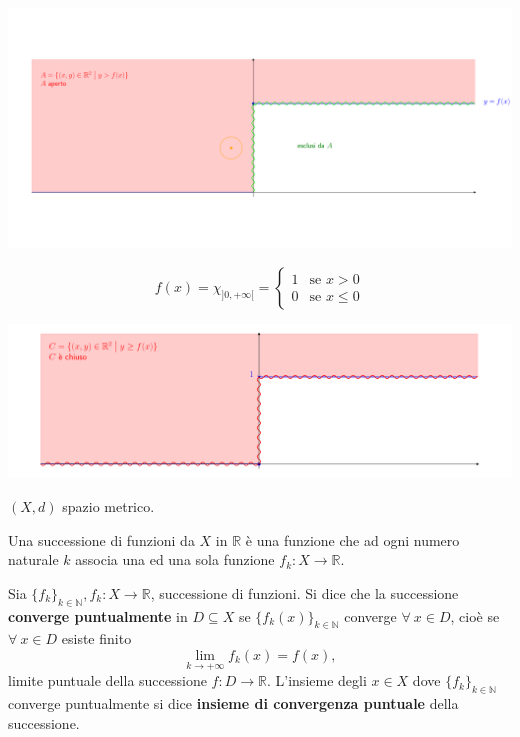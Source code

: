\begin{exbar}
\begin{example}
\begin{enumerate}
		\begin{center}
			\includegraphics[width=0.7\linewidth]{spazi_metrici_e_normati/pag181_1}
			\label{fig:pag1811}
		\end{center}
		
		\begin{equation*}
			f(x) = 		\chi_{]0,+\infty[} = 
			\begin{cases}
				1 & \text{se } x > 0
				\\
				0 &  \text{se } x \leq 0
			\end{cases}
		\end{equation*}
		
		\begin{center}
			\includegraphics[width=0.7\linewidth]{spazi_metrici_e_normati/pag181_2}
			\label{fig:pag1812}
		\end{center}
	\end{enumerate}
\end{example}
\end{exbar}




$(X,d)$ spazio metrico.
	
Una successione di funzioni da $X$ in $\mathbb{R}$ è una funzione che ad ogni numero naturale $k$ associa una ed una sola funzione $f_k : X \rightarrow \mathbb{R}$. 


\begin{definition}
	Sia $\{ f_k \}_{k \in \mathbb{N}}, f_k : X \rightarrow \mathbb{R}$, successione di funzioni. Si dice che la successione \textbf{converge puntualmente} in $D \subseteq X$ se $\{ f_k(x) \}_{k \in \mathbb{N}}$ converge $\forall \ x \in D$, cioè se $\forall \ x \in D$ esiste finito
	\begin{equation*}
		\lim_{k \rightarrow + \infty} f_k(x) = f(x),
	\end{equation*}
	limite puntuale della successione $f : D \rightarrow \mathbb{R}$. L'insieme degli $x \in X$ dove $\{f_k \}_{k \in \mathbb{N}}$ converge puntualmente si dice \textbf{insieme di convergenza puntuale} della successione.
\end{definition}



